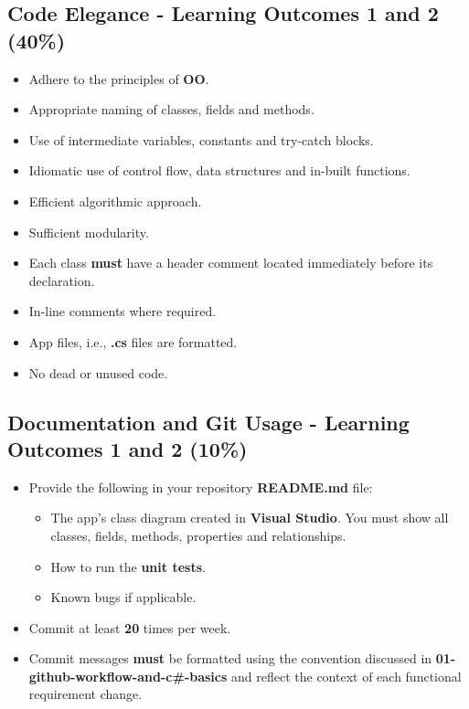 \documentclass{article}
\begin{document}
\subsection*{Code Elegance - Learning Outcomes 1 and 2  (40\%)}
\begin{itemize}
    \item Adhere to the principles of \textbf{OO}.
    \item Appropriate naming of classes, fields and methods.
    \item Use of intermediate variables, constants and try-catch blocks.
    \item Idiomatic use of control flow, data structures and in-built functions.
    \item Efficient algorithmic approach.
    \item Sufficient modularity.
    \item Each class \textbf{must} have a header comment located immediately before its declaration.
    \item In-line comments where required. 
    \item App files, i.e., \textbf{.cs} files are formatted. 
    \item No dead or unused code.
\end{itemize}

\subsection*{Documentation and Git Usage - Learning Outcomes 1 and 2 (10\%)}
\begin{itemize}
    \item Provide the following in your repository \textbf{README.md} file:
    \begin{itemize}
        \item The app's class diagram created in \textbf{Visual Studio}. You must show all classes, fields, methods, properties and relationships.
        \item How to run the \textbf{unit tests}.
        \item Known bugs if applicable.
    \end{itemize}
    \item Commit at least \textbf{20} times per week.
    \item Commit messages \textbf{must} be formatted using the convention discussed in \textbf{01-github-workflow-and-c\#-basics} and reflect the context of each functional requirement change.
\end{itemize}
\end{document}
